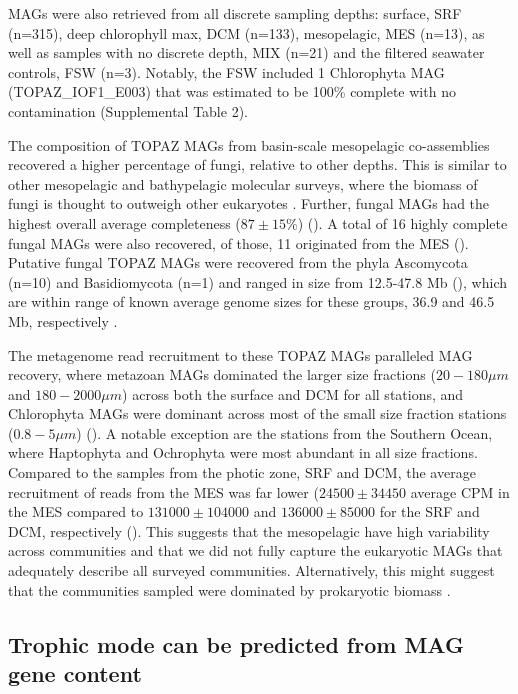 \documentclass[12pt]{article}
\numberwithin{equation}{section}
\begin{document}
MAGs were also retrieved from all discrete sampling depths: surface, SRF (n=315), deep chlorophyll max, DCM (n=133), mesopelagic, MES (n=13), as well as samples with no discrete depth, MIX (n=21) and the filtered seawater controls, FSW (n=3). Notably, the FSW included 1 Chlorophyta MAG (TOPAZ\_IOF1\_E003) that was estimated to be 100\% complete with no contamination (Supplemental Table 2). 

The composition of TOPAZ MAGs from basin-scale mesopelagic co-assemblies recovered a higher percentage of fungi, relative to other depths. This is similar to other mesopelagic and bathypelagic molecular surveys, where the biomass of fungi is thought to outweigh other eukaryotes \citep{Morales_2019,Pernice_2015,Edgcomb_2010}. Further, fungal MAGs had the highest overall average completeness ($87 \pm 15\%$) (). A total of 16 highly complete fungal MAGs were also recovered, of those, 11 originated from the MES (). Putative fungal TOPAZ MAGs were recovered from the phyla Ascomycota (n=10) and Basidiomycota (n=1) and ranged in size from 12.5-47.8 Mb (), which are within range of known average genome sizes for these groups, 36.9 and 46.5 Mb, respectively \citep{Mohanta_2015}. 

The metagenome read recruitment to these TOPAZ MAGs paralleled MAG recovery, where metazoan MAGs dominated the larger size fractions ($20-180 \mu m$ and $180-2000 \mu m$) across both the surface and DCM for all stations, and Chlorophyta MAGs were dominant across most of the small size fraction stations ($0.8-5 \mu m$) (). A notable exception are the stations from the Southern Ocean, where Haptophyta and Ochrophyta were most abundant in all size fractions. Compared to the samples from the photic zone, SRF and DCM, the average recruitment of reads from the MES was far lower ($24500 \pm 34450$ average CPM in the MES compared to $131000 \pm 104000 $ and $136000 \pm 85000$ for the SRF and DCM, respectively (). This suggests that the mesopelagic have high variability across communities \citep{Pernice_2015} and that we did not fully capture the eukaryotic MAGs that adequately describe all surveyed communities. Alternatively, this might suggest that the communities sampled were dominated by prokaryotic biomass \citep{Pernice_2014}.  


\subsection*{Trophic mode can be predicted from MAG gene content}
\end{document}
